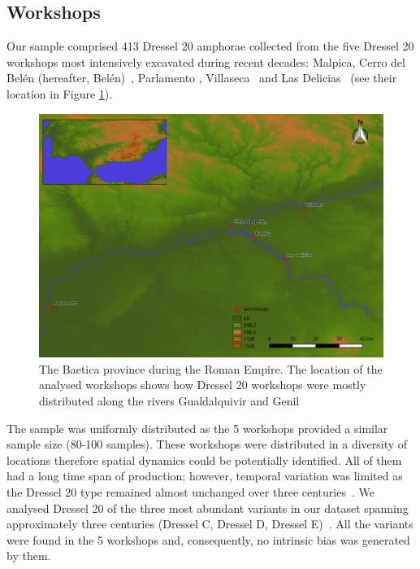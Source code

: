 \documentclass[review]{elsarticle}
\begin{document}
\subsection{Workshops}

Our sample comprised 413 Dressel 20 amphorae collected from the five Dressel 20 workshops most intensively excavated during recent decades: Malpica, Cerro del Belén (hereafter, Belén)~\citep{diaz_trujillo_excavacion_1992}, Parlamento \citep{garcia_vargas_anforas_2000}, Villaseca~\citep{garcia_vargas_enrique_excavacion_????} and Las Delicias~\citep{fernandez_excavacion_2001,_atelier_2014} (see their location in Figure \ref{romanworkshop}).

\begin{figure}[htp]
	\centering
\includegraphics[width=\linewidth]{figs/romanworkshop}
\caption{The Baetica province during the Roman Empire. The location of the analysed workshops shows how Dressel 20 workshops were mostly distributed along the rivers Gualdalquivir and Genil}
\label{romanworkshop}
\end{figure} 

The sample was uniformly distributed as the 5 workshops provided a similar sample size (80-100 samples). These workshops were distributed in a diversity of locations therefore spatial dynamics could be potentially identified. All of them had a long time span of production; however, temporal variation was limited as the Dressel 20 type remained almost unchanged over three centuries~\citep{berni_dressel_2016}. We analysed Dressel 20 of the three most abundant variants in our dataset spanning approximately three centuries (Dressel C, Dressel D, Dressel E)~\citep{martin-kilcher_romischen_1994,berni_millet_epigrafianforica_2008}. All the variants were found in the 5 workshops and, consequently, no intrinsic bias was generated by them. 
\end{document}
